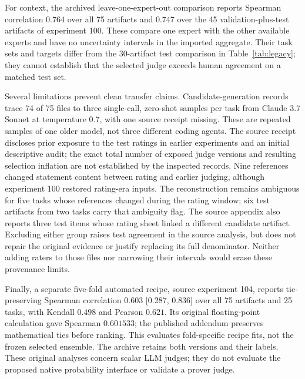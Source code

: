 For context, the archived leave-one-expert-out comparison reports Spearman correlation $0.764$ over all 75 artifacts and $0.747$ over the 45 validation-plus-test artifacts of experiment 100.
These compare one expert with the other available experts and have no uncertainty intervals in the imported aggregate.
Their task sets and targets differ from the 30-artifact test comparison in Table~\ref{tab:legacy}; they cannot establish that the selected judge exceeds human agreement on a matched test set.

Several limitations prevent clean transfer claims.
Candidate-generation records trace 74 of 75 files to three single-call, zero-shot samples per task from Claude 3.7 Sonnet at temperature $0.7$, with one source receipt missing.
These are repeated samples of one older model, not three different coding agents.
The source receipt discloses prior exposure to the test ratings in earlier experiments and an initial descriptive audit; the exact total number of exposed judge versions and resulting selection inflation are not established by the inspected records.
Nine references changed statement content between rating and earlier judging, although experiment 100 restored rating-era inputs.
The reconstruction remains ambiguous for five tasks whose references changed during the rating window; six test artifacts from two tasks carry that ambiguity flag.
The source appendix also reports three test items whose rating sheet linked a different candidate artifact.
Excluding either group raises test agreement in the source analysis, but does not repair the original evidence or justify replacing its full denominator.
Neither adding raters to those files nor narrowing their intervals would erase these provenance limits.

Finally, a separate five-fold automated recipe, source experiment 104, reports tie-preserving Spearman correlation $0.603$ [0.287, 0.836] over all 75 artifacts and 25 tasks, with Kendall $0.498$ and Pearson $0.621$.
Its original floating-point calculation gave Spearman $0.601533$; the published addendum preserves mathematical ties before ranking.
This evaluates fold-specific recipe fits, not the frozen selected ensemble.
The archive retains both versions and their labels.
These original analyses concern scalar LLM judges; they do not evaluate the proposed native probability interface or validate a prover judge.

